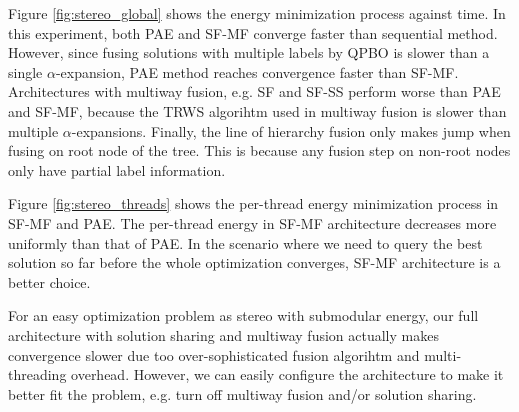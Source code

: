 Figure \ref{fig:stereo_global} shows the energy minimization process
against time. In this experiment, both PAE and SF-MF converge faster
than sequential method. However, since fusing solutions with multiple
labels by QPBO is slower than a single $\alpha$-expansion, PAE method
reaches convergence faster than SF-MF. Architectures with multiway
fusion, e.g. SF and SF-SS perform worse than PAE and SF-MF, because
the TRWS algorihtm used in multiway fusion is slower than multiple
$\alpha$-expansions. Finally, the line of hierarchy fusion only makes
jump when fusing on root node of the tree. This is because any fusion
step on non-root nodes only have partial label information.

Figure \ref{fig:stereo_threads} shows the per-thread energy
minimization process in SF-MF and PAE. The per-thread energy in SF-MF
architecture decreases more uniformly than that of PAE. In the
scenario where we need to query the best solution so far before the
whole optimization converges, SF-MF architecture is a better choice.

For an easy optimization problem as stereo with submodular energy, our
full architecture with solution sharing and multiway fusion actually
makes convergence slower due too over-sophisticated fusion algorihtm
and multi-threading overhead. However, we can easily configure the
architecture to make it better fit the problem, e.g. turn off multiway
fusion and/or solution sharing.

